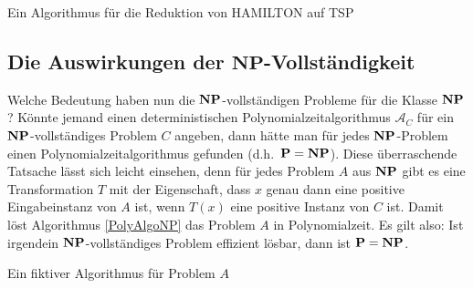 \begin{algorithm}
\caption{Ein Algorithmus für die Reduktion von \textsf{HAMILTON} auf \textsf{TSP}}
\label{TSPRed}
\BlankLine
{}
\end{algorithm}

\subsection{Die Auswirkungen der $\mathbf{NP}$-Vollständigkeit}
Welche Bedeutung haben nun die $\mathbf{N}\mathbf{P}$-vollstän\-digen Probleme für die
Klasse $\mathbf{N}\mathbf{P}$? Könnte jemand einen deterministischen
Polynomialzeitalgorithmus $\mathcal{A}_C$ für ein
$\mathbf{N}\mathbf{P}$-voll\-stän\-diges Problem $C$ angeben, dann hätte man für jedes
$\mathbf{N}\mathbf{P}$-Problem einen Polynomialzeitalgorithmus gefunden
(d.h.~$\mathbf{P}=\mathbf{N}\mathbf{P}$). Diese überraschende Tatsache lässt sich leicht
einsehen, denn für jedes Problem $A$ aus $\mathbf{N}\mathbf{P}$ gibt es eine
Transformation $T$ mit der Eigenschaft, dass $x$ genau dann eine
positive Eingabeinstanz von $A$ ist, wenn $T(x)$ eine positive Instanz
von $C$ ist. Damit löst Algorithmus \ref{PolyAlgoNP} das Problem $A$
in Polynomialzeit. Es gilt also: Ist irgendein $\mathbf{N}\mathbf{P}$-vollstän\-diges
Problem effizient lösbar, dann ist $\mathbf{P}=\mathbf{N}\mathbf{P}$.

\begin{algorithm}
\caption{Ein fiktiver Algorithmus für Problem $A$}
\label{PolyAlgoNP}
\BlankLine
{}
\end{algorithm}

